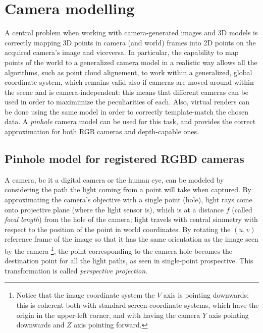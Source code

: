 \section{Camera modelling} \label{sec:camera_modelling}
A central problem when working with camera-generated images and 3D models is
correctly mapping 3D points in camera (and world) frames into 2D points on the
acquired camera's image and viceversa. In particular, the capability to map
points of the world to a generalized camera model in a realistic way allows all
the algorithms, such as point cloud alignement, to work within a generalized,
global coordinate system, which remains valid also if cameras are moved around
within the scene and is camera-independent: this means that different cameras
can be used in order to maximimize the peculiarities of each. Also, virtual
renders can be done using the same model in order to correctly template-match
the chosen data.  A \emph{pinhole} camera model can be used for this task, and
provides the correct approximation for both RGB cameras and depth-capable ones.

\subsection{Pinhole model for registered RGBD cameras}\label{sec:intrinsics}
A camera, be it a digital camera or the human eye, can be modeled by
considering the path the light coming from a point will take when
captured. By approximating the camera's objective with a single point (hole),
light rays come onto projective plane (where the light sensor is), which is at a
distance $f$ (called \emph{focal length}) from the hole of the camera; light
travels with central
simmetry with respect to the position of the point in world coordinates. By
rotating the $(u,v)$ reference frame of the image so that it has the same
orientation as the image seen by the camera \footnote{Notice that the image
  coordinate system the $V$ axis is pointing downwards; this is coherent both
  with standard screen coordinate systems, which have the origin in the
  upper-left corner, and with having the camera $Y$ axis pointing downwards and
$Z$ axis pointing forward.}, the point corresponding to the camera hole
becomes the destination point for all the light paths, as seen in single-point
prospective. This transformation is called \emph{perspective projection}.


